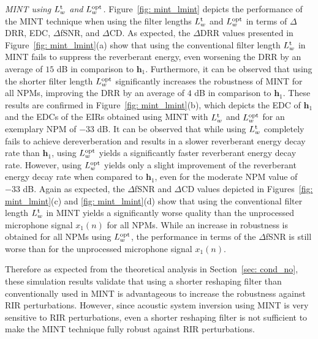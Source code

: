 \documentclass[twocolumn]{bmcart}%
\begin{document}
\emph{MINT using $L^{\rm t}_w$ and $L_w^{\rm opt}$.} \enspace Figure~\ref{fig: mint_lmint} depicts the performance of the MINT technique when using the filter lengths $L^{\rm t}_w$ and $L_w^{\rm opt}$ in terms of $\Delta$DRR, EDC, $\Delta$fSNR, and $\Delta$CD.
As expected, the $\Delta$DRR values presented in Figure~\ref{fig: mint_lmint}(a) show that using the conventional filter length $L^{\rm t}_w$ in MINT fails to suppress the reverberant energy, even worsening the DRR by an average of $15$ dB in comparison to $\mathbf{h}_1$.
Furthermore, it can be observed that using the shorter filter length $L^{\rm opt}_w$ significantly increases the robustness of MINT for all NPMs, improving the DRR by an average of $4$ dB in comparison to $\mathbf{h}_1$.
These results are confirmed in Figure~\ref{fig: mint_lmint}(b), which depicts the EDC of $\mathbf{h}_1$ and the EDCs of the EIRs obtained using MINT with $L^{\rm t}_w$ and $L^{\rm opt}_w$ for an exemplary NPM of $-33$ dB.
It can be observed that while using $L^{\rm t}_w$ completely fails to achieve dereverberation and results in a slower reverberant energy decay rate than $\mathbf{h}_1$, using $L^{\rm opt}_w$ yields a significantly faster reverberant energy decay rate.
However, using $L^{\rm opt}_w$ yields only a slight improvement of the reverberant energy decay rate when compared to $\mathbf{h}_1$, even for the moderate NPM value of $-33$ dB.
Again as expected, the $\Delta$fSNR and $\Delta$CD values depicted in Figures~\ref{fig: mint_lmint}(c) and \ref{fig: mint_lmint}(d) show that using the conventional filter length $L^{\rm t}_w$ in MINT yields a significantly worse quality than the unprocessed microphone signal $x_1(n)$ for all NPMs.
While an increase in robustness is obtained for all NPMs using $L^{\rm opt}_w$, the performance in terms of the $\Delta$fSNR is still worse than for the unprocessed microphone signal $x_1(n)$.

Therefore as expected from the theoretical analysis in Section~\ref{sec: cond_no}, these simulation results validate that using a shorter reshaping filter than conventionally used in MINT is advantageous to increase the robustness against RIR perturbations. 
However, since acoustic system inversion using MINT is very sensitive to RIR perturbations, even a shorter reshaping filter is not sufficient to make the MINT technique fully robust against RIR perturbations.
\end{document}
